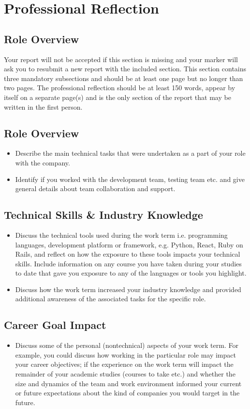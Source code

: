 \section*{Professional Reflection}
	\subsection*{Role Overview}
		Your report will not be accepted if this section is missing and your marker will ask you to resubmit a new report with the included section. This section contains three mandatory subsections and should be at least one page but no longer than two pages. The professional reflection should be at least 150 words, appear by itself on a separate page(s) and is the only section of the report that may be written in the first person.

	\subsection*{Role Overview}
		\begin{itemize}
			\item Describe the main technical tasks that were undertaken as a part of your role with the
company.
			\item Identify if you worked with the development team, testing team etc. and give general details
about team collaboration and support.
		\end{itemize}
		
	\subsection*{Technical Skills \& Industry Knowledge}
		\begin{itemize}
			\item Discuss the technical tools used during the work term i.e. programming languages, development platform or framework, e.g. Python, React, Ruby on Rails, and reflect on how the exposure to these tools impacts your technical skills. Include information on any course you have taken during your studies to date that gave you exposure to any of the languages or tools you highlight.
			\item Discuss how the work term increased your industry knowledge and provided additional awareness of the associated tasks for the specific role.
		\end{itemize}
	
	\subsection*{Career Goal Impact}
		\begin{itemize}
			\item Discuss some of the personal (nontechnical) aspects of your work term. For example, you could discuss how working in the particular role may impact your career objectives; if the experience on the work term will impact the remainder of your academic studies (courses to take etc.) and whether the size and dynamics of the team and work environment informed your current or future expectations about the kind of companies you would target in the future.
		\end{itemize}
